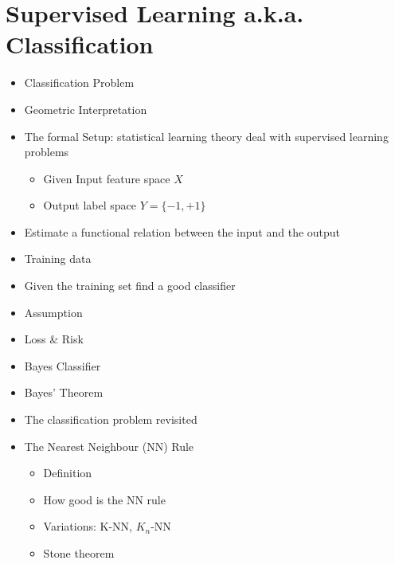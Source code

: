 \documentclass[12pt,oneside]{report}
\begin{document}
\section{Supervised Learning a.k.a. Classification}
\begin{itemize}
    \item Classification Problem
    \item Geometric Interpretation
    \item The formal Setup: statistical learning theory deal with supervised learning problems
    \begin{itemize}
        \item Given Input feature space \(X\)
        \item Output label space \(Y = \{-1, +1\}\)
    \end{itemize}
    \item Estimate a functional relation between the input and the output
    \item Training data
    \item Given the training set find a good classifier
    \item Assumption
    \item Loss \& Risk
    \item Bayes Classifier
    \item Bayes' Theorem
    \item The classification problem revisited
    \item The Nearest Neighbour (NN) Rule
    \begin{itemize}
        \item Definition
        \item How good is the NN rule
        \item Variations: K-NN, \(K_n\)-NN
        \item Stone theorem
    \end{itemize}
\end{itemize}
\end{document}

